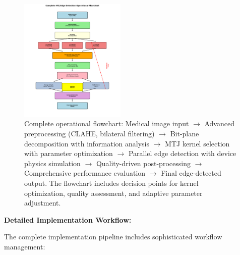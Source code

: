 \documentclass[conference]{IEEEtran}
\begin{document}
\begin{figure}[htbp]
\centerline{\includegraphics[width=0.45\textwidth]{operation_flowchart.png}}
\caption{Complete operational flowchart: Medical image input $\rightarrow$ Advanced preprocessing (CLAHE, bilateral filtering) $\rightarrow$ Bit-plane decomposition with information analysis $\rightarrow$ MTJ kernel selection with parameter optimization $\rightarrow$ Parallel edge detection with device physics simulation $\rightarrow$ Quality-driven post-processing $\rightarrow$ Comprehensive performance evaluation $\rightarrow$ Final edge-detected output. The flowchart includes decision points for kernel optimization, quality assessment, and adaptive parameter adjustment.}
\label{fig:flowchart}
\end{figure}

\textbf{Detailed Implementation Workflow:}

The complete implementation pipeline includes sophisticated workflow management:
\end{document}
